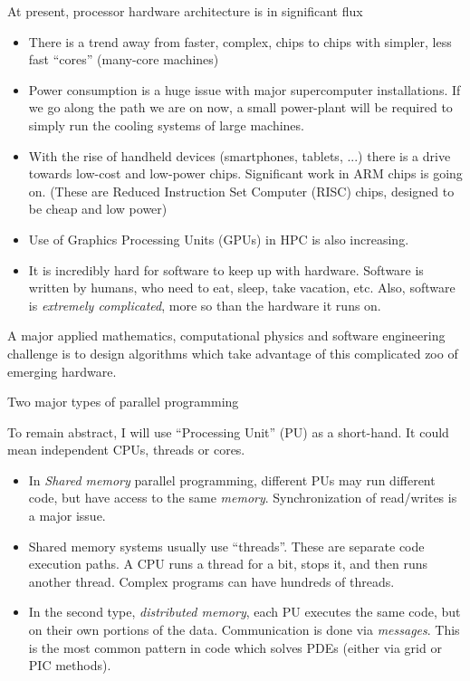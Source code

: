 \documentclass[aspectratio=169]{beamer}
\newcommand{\mypause}{\pause}
\begin{document}
\begin{frame}{At present, processor hardware architecture is in
    significant flux}
  \footnotesize%
  \begin{itemize}
  \item There is a trend away from faster, complex, chips to chips
    with simpler, less fast ``cores'' (many-core machines)
  \item Power consumption is a huge issue with major supercomputer
    installations. If we go along the path we are on now, a small
    power-plant will be required to simply run the cooling systems of
    large machines.
  \item With the rise of handheld devices (smartphones, tablets, ...)
    there is a drive towards low-cost and low-power chips. Significant
    work in ARM chips is going on. (These are Reduced Instruction Set
    Computer (RISC) chips, designed to be cheap and low power)
  \item Use of Graphics Processing Units (GPUs) in HPC is also
    increasing.
  \item It is incredibly hard for software to keep up with
    hardware. Software is written by humans, who need to eat, sleep,
    take vacation, etc. Also, software is \emph{extremely
      complicated}, more so than the hardware it runs on.
  \end{itemize}
  {\color{blue} A major applied mathematics, computational physics and
    software engineering challenge is to design algorithms which take
    advantage of this complicated zoo of emerging hardware.}

\end{frame}

\begin{frame}{Two major types of parallel programming}

  To remain abstract, I will use ``Processing Unit'' (PU) as a
  short-hand. It could mean independent CPUs, threads or cores.
  \begin{itemize}
  \item In \emph{Shared memory} parallel programming, different PUs
    may run different code, but have access to the same
    \emph{memory}. Synchronization of read/writes is a major
    issue.
  \item Shared memory systems usually use ``threads''. These are
    separate code execution paths. A CPU runs a thread for a bit, stops
    it, and then runs another thread. Complex programs can have
    hundreds of threads. %
    \mypause%
  \item In the second type, \emph{distributed memory}, each PU
    executes the same code, but on their own portions of the
    data. Communication is done via \emph{messages}. This is the most
    common pattern in code which solves PDEs (either via grid or PIC
    methods).
  \end{itemize}  
\end{frame}
\end{document}
